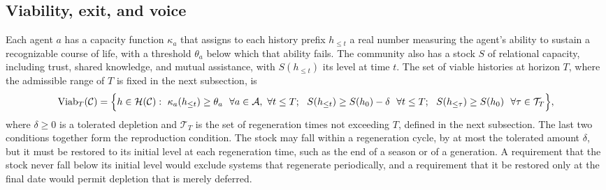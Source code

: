 \documentclass[12pt]{article}
\begin{document}
\subsection{Viability, exit, and voice}

Each agent $a$ has a capacity function $\kappa_a$ that assigns to each history prefix $h_{\le t}$ a real number measuring the agent's ability to sustain a recognizable course of life, with a threshold $\theta_a$ below which that ability fails. The community also has a stock $S$ of relational capacity, including trust, shared knowledge, and mutual assistance, with $S(h_{\le t})$ its level at time $t$. The set of viable histories at horizon $T$, where the admissible range of $T$ is fixed in the next subsection, is
\[
\mathrm{Viab}_T(\mathcal C)=\Bigl\{h\in\mathcal H(\mathcal C):\ \kappa_a(h_{\le t})\ge\theta_a\ \ \forall a\in\mathcal A,\ \forall t\le T;\ \ S(h_{\le t})\ge S(h_0)-\delta\ \ \forall t\le T;\ \ S(h_{\le\tau})\ge S(h_0)\ \ \forall\tau\in\mathcal T_T\Bigr\},
\]
where $\delta\ge 0$ is a tolerated depletion and $\mathcal T_T$ is the set of regeneration times not exceeding $T$, defined in the next subsection. The last two conditions together form the reproduction condition. The stock may fall within a regeneration cycle, by at most the tolerated amount $\delta$, but it must be restored to its initial level at each regeneration time, such as the end of a season or of a generation. A requirement that the stock never fall below its initial level would exclude systems that regenerate periodically, and a requirement that it be restored only at the final date would permit depletion that is merely deferred.
\end{document}
